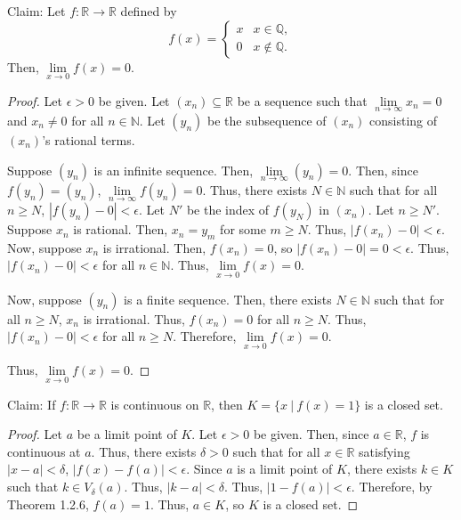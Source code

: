 \documentclass[12pt]{article}
\begin{document}
\newpage
{} Claim: Let $f: \mathbb R \to \mathbb R$ defined by \[f(x) = \begin{cases} x & x \in \mathbb Q, \\ 0 & x \notin \mathbb Q. \end{cases}\] Then, $\lim\limits_{x \to 0}f(x) = 0$.
\begin{proof}
    Let $\epsilon > 0$ be given.
    Let $(x_n) \subseteq \mathbb R$ be a sequence such that $\lim\limits_{n \to \infty} x_n = 0$ and $x_n \neq 0$ for all $n \in \mathbb N$.
    Let $(y_n)$ be the subsequence of $(x_n)$ consisting of $(x_n)$'s rational terms.

    Suppose $(y_n)$ is an infinite sequence.
        Then, $\lim\limits_{n\to\infty} (y_n) = 0.$
        Then, since $f(y_n) = (y_n)$, $\lim\limits_{n \to \infty} f(y_n) = 0$.
        Thus, there exists $N \in \mathbb N$ such that for all $n \geq N$, $|f(y_n) - 0| < \epsilon$.
        Let $N'$ be the index of $f(y_N)$ in $(x_n)$.
        Let $n \geq N'$.
        Suppose $x_n$ is rational.
            Then, $x_n = y_m$ for some $m \geq N$.
            Thus, $|f(x_n) - 0| < \epsilon$.
        Now, suppose $x_n$ is irrational.
            Then, $f(x_n) = 0$, so $|f(x_n) - 0| = 0 < \epsilon$.
        Thus, $|f(x_n) - 0| < \epsilon$ for all $n \in \mathbb N$.
        Thus, $\lim\limits_{x \to 0} f(x) = 0$.

    Now, suppose $(y_n)$ is a finite sequence.
        Then, there exists $N \in \mathbb N$ such that for all $n \geq N$, $x_n$ is irrational.
        Thus, $f(x_n) = 0$ for all $n \geq N$.
        Thus, $|f(x_n) - 0| < \epsilon$ for all $n \geq N$.
        Therefore, $\lim\limits_{x \to 0} f(x) = 0$.

    Thus, $\lim\limits_{x \to 0} f(x) = 0$.
\end{proof}

\newpage
{} Claim: If $f: \mathbb R \to \mathbb R$ is continuous on $\mathbb R$, then $K = \{x~|~f(x)=1\}$ is a closed set.
\begin{proof}
    Let $a$ be a limit point of $K$.
    Let $\epsilon > 0$ be given.
    Then, since $a \in \mathbb R$, $f$ is continuous at $a$.
    Thus, there exists $\delta > 0$ such that for all $x \in \mathbb R$ satisfying $|x - a| < \delta$, $|f(x) - f(a)| < \epsilon$.
    Since $a$ is a limit point of $K$, there exists $k \in K$ such that $k \in V_\delta(a)$.
    Thus, $|k - a| < \delta$.
    Thus, $|1 - f(a)| < \epsilon$.
    Therefore, by Theorem 1.2.6, $f(a) = 1$.
    Thus, $a \in K$, so $K$ is a closed set.
\end{proof}
\end{document}
